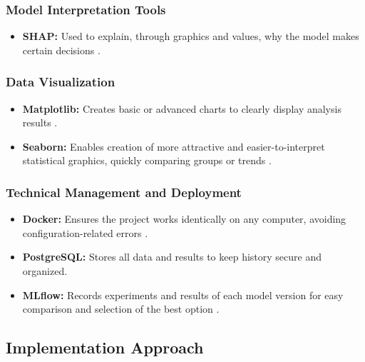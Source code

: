 \subsubsection{Model Interpretation Tools}

\begin{itemize}
    \item \textbf{SHAP:} Used to explain, through graphics and values, why the model makes certain decisions \cite{shap_intro}.
\end{itemize}

\subsubsection{Data Visualization}

\begin{itemize}
    \item \textbf{Matplotlib:} Creates basic or advanced charts to clearly display analysis results \cite{matplotlib_org}.
    
    \item \textbf{Seaborn:} Enables creation of more attractive and easier-to-interpret statistical graphics, quickly comparing groups or trends \cite{seaborn_org}.
\end{itemize}

\subsubsection{Technical Management and Deployment}

\begin{itemize}
    \item \textbf{Docker:} Ensures the project works identically on any computer, avoiding configuration-related errors \cite{kdnuggets_pipeline}.
    
    \item \textbf{PostgreSQL:} Stores all data and results to keep history secure and organized.
    
    \item \textbf{MLflow:} Records experiments and results of each model version for easy comparison and selection of the best option \cite{datacamp_mlops}.
\end{itemize}

\subsection{Implementation Approach}


